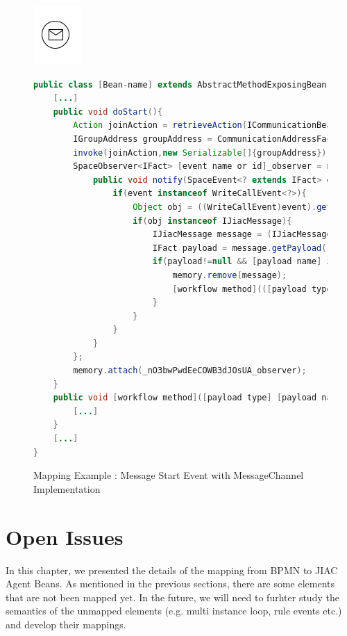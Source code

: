 \begin{figure}[h]
\begin{minipage}[c]{0.28\textwidth}
\includegraphics{images/mapping/message_start.png}
\end{minipage}
\begin{minipage}[c]{0.72\textwidth}
\begin{lstlisting}[language = Java]
public class [Bean-name] extends AbstractMethodExposingBean{
	[...]
	public void doStart(){
		Action joinAction = retrieveAction(ICommunicationBean.ACTION_JOIN_GROUP);
		IGroupAddress groupAddress = CommunicationAddressFactory.createGroupAddress([channel]);
		invoke(joinAction,new Serializable[]{groupAddress});
		SpaceObserver<IFact> [event name or id]_observer = new SpaceObserver<IFact>(){
			public void notify(SpaceEvent<? extends IFact> event) { 
				if(event instanceof WriteCallEvent<?>){
					Object obj = ((WriteCallEvent)event).getObject();
					if(obj instanceof IJiacMessage){ 
						IJiacMessage message = (IJiacMessage)obj;
						IFact payload = message.getPayload();
						if(payload!=null && [payload name] instanceof [payload type] &&  message.getHeader(IJiacMessage.Header.SEND_TO).equalsIgnoreCase([channel]){
							memory.remove(message);
							[workflow method](([payload type])payload);
						}
					}
				}
			}
		};
		memory.attach(_nO3bwPwdEeCOWB3dJOsUA_observer);
	}
	public void [workflow method]([payload type] [payload name]){
		[...]
	}	
	[...]
}
\end{lstlisting}
\end{minipage}
\caption{Mapping Example : Message Start Event with MessageChannel Implementation}%
\label{fig:channel_start}
\end{figure}

\newpage
\section{Open Issues}

In this chapter, we presented the details of the mapping from BPMN to JIAC Agent Beans. As mentioned in the previous sections, there are some elements that are not been mapped yet. In the future, we will need to furhter study the semantics of the unmapped elements (e.g. multi instance loop, rule events etc.) and develop their mappings.

